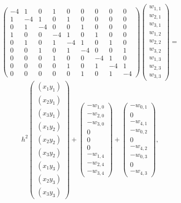 \[\left(\begin{array}{ccccccccc}
-4& 1 & 0 &1 &0 &0 &0 &0 &0\\
1&-4& 1 & 0 &1 &0 &0 &0 &0 \\
0 &1&-4&  0&0 &1 &0 &0 &0 \\
1 &0 &0 &-4& 1 & 0 &1 &0 &0\\
0 & 1 &0 &1&-4& 1 &0 &1 &0  \\
0 &0 &1 &0 &1&-4&0&  0 &1  \\
0&0&0&1 &0 &0 &-4& 1 & 0\\
0&0&0&0 & 1 &0 &1&-4& 1   \\
0&0&0&0 &0 &1 &0 &1&-4
\end{array}\right)
\left(\begin{array}{c}
w_{1,1}\\
w_{2,1}\\
w_{3,1}\\
w_{1,2}\\
w_{2,2}\\
w_{3,2}\\
w_{1,3}\\
w_{2,3}\\
w_{3,3}
\end{array}\right)=\]
\[
h^2\left(\begin{array}{c}
(x_1y_1)\\
(x_2y_1)\\
(x_3y_1)\\
(x_1y_2)\\
(x_2y_2)\\
(x_3y_2)\\
(x_1y_3)\\
(x_2y_3)\\
(x_3y_3)
\end{array}\right)+
\left(\begin{array}{c}
-w_{1,0}\\
-w_{2,0}\\
-w_{3,0}\\
0\\
0\\
0\\
-w_{1,4}\\
-w_{2,4}\\
-w_{3,4}
\end{array}\right)
+\left(\begin{array}{c}
-w_{0,1}\\
0\\
-w_{4,1}\\
-w_{0,2}\\
0\\
-w_{4,2}\\
-w_{0,3}\\
0\\
-w_{4,3}
\end{array}\right),
\]	
